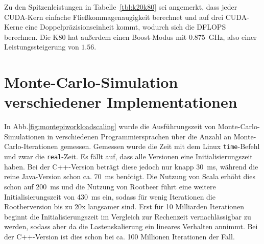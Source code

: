 \documentclass[german,bibnum,beleg,zihtitle,german,hyperref,utf8]{zihpub}
\begin{document}
Zu den Spitzenleistungen in Tabelle~\ref{tbl:k20k80} sei angemerkt, dass jeder CUDA-Kern einfache Fließkommagenaugigkeit berechnet und auf drei CUDA-Kerne eine Doppelpräzisionseinheit kommt, wodurch sich die DFLOPS berechnen.
Die K80 hat außerdem einen Boost-Modus mit \SI{0.875}{\giga\hertz}, also einer Leistungssteigerung von $1.56$.

\section{Monte-Carlo-Simulation verschiedener Implementationen}

In Abb.\ref{fig:montepiworkloadscaling} wurde die Ausführungszeit von Monte-Carlo-Simulationen in verschiedenen Programmiersprachen über die Anzahl an Monte-Carlo-Iterationen gemessen. Gemessen wurde die Zeit mit dem Linux \texttt{time}-Befehl und zwar die \texttt{real}-Zeit. Es fällt auf, dass alle Versionen eine Initialisierungszeit haben. Bei der C++-Version beträgt diese jedoch nur knapp \SI{30}{\milli\second}, während die reine Java-Version schon ca. \SI{70}{\milli\second} benötigt. Die Nutzung von Scala erhöht dies schon auf \SI{200}{\milli\second} und die Nutzung von Rootbeer führt eine weitere Initialisierungszeit von \SI{430}{\milli\second} ein, sodass für wenig Iterationen die Rootberversion bis zu 20x langsamer sind. Erst für 10 Milliarden Iterationen beginnt die Initialisierungszeit im Vergleich zur Rechenzeit vernachlässigbar zu werden, sodass aber da die Lastenskalierung ein lineares Verhalten annimmt. Bei der C++-Version ist dies schon bei ca. 100 Millionen Iterationen der Fall.
\end{document}
